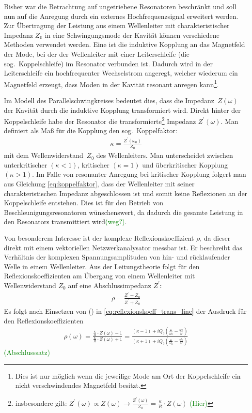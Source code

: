 \documentclass[11pt, a4paper]{scrbook}
\newcommand{\todo}[1]{{\textcolor{Green}{(#1)}}}
\begin{document}
	Bisher war die Betrachtung auf ungetriebene Resonatoren beschränkt und soll nun auf die Anregung durch ein externes Hochfrequenzsignal erweitert werden.
	Zur Übertragung der Leistung aus einem Wellenleiter mit charakteristischer Impedanz $Z_0$ in eine Schwingungsmode der Kavität können verschiedene Methoden verwendet werden.
	Eine ist die induktive Kopplung an das Magnetfeld der Mode, bei der der Wellenleiter mit einer Leiterschleife (die sog.\ Koppelschleife) im Resonator verbunden ist.
	Dadurch wird in der Leiterschleife ein hochfrequenter Wechselstrom angeregt, welcher wiederum ein Magnetfeld erzeugt, dass Moden in der Kavität resonant anregen kann\footnote{Dies ist nur möglich wenn die jeweilige Mode am Ort der Koppelschleife ein nicht verschwindendes Magnetfeld besitzt.}.
	
	Im Modell des Parallelschwingkreises bedeutet dies, dass die Impedanz~$Z(\omega)$ der Kavität durch die induktive Kopplung transformiert wird.
	Direkt hinter der Koppelschleife habe der Resonator die transformierte\footnote{insbesondere gilt: $Z^\prime(\omega) \propto Z(\omega) \longrightarrow \frac{Z^\prime(\omega)}{Z_0} = \frac{\kappa}{R} \cdot Z(\omega)$ \todo{Hier}} Impedanz $Z^\prime(\omega)$.
	Man definiert als Maß für die Kopplung den sog.\ Koppelfaktor:
	\begin{align}
		\kappa = \frac{Z^\prime(\omega_0)}{Z_0}
		\label{eq:koppelfaktor}
	\end{align}
	mit dem Wellenwiderstand~$Z_0$ des Wellenleiters.
	Man unterscheidet zwischen unterkritischer $(\kappa < 1)$, kritischer $(\kappa = 1)$ und überkritischer Kopplung $(\kappa > 1)$.
	Im Falle von resonanter Anregung bei kritischer Kopplung folgert man aus Gleichung \eqref{eq:koppelfaktor}, dass der Wellenleiter mit seiner charakteristischen Impedanz abgeschlossen ist und somit keine Reflexionen an der Koppelschleife entstehen.
	Dies ist für den Betrieb von Beschleunigungsresonatoren wünschenswert, da dadurch die gesamte Leistung in den Resonators transmittiert wird\todo{weg?}.
	
	Von besonderem Interesse ist der komplexe Reflexionskoeffizient $\rho$, da dieser direkt mit einem vektoriellen Netzwerkanalysator messbar ist.
	Er beschreibt das Verhältnis der komplexen Spannungsamplituden von hin- und rücklaufender Welle in einem Wellenleiter.
	Aus der Leitungstheorie \cite{pozar} folgt für den Reflexionskoeffizienten am Übergang von einem Wellenleiter mit Wellenwiderstand $Z_0$ auf eine Abschlussimpedanz $Z^\prime$:
	\begin{align}
		\rho = \frac{Z^\prime - Z_0}{Z^\prime + Z_0}
		\label{eq:reflexionskoeff_trans_line}
	\end{align}
	Es folgt nach Einsetzen von () in \eqref{eq:reflexionskoeff_trans_line} der Ausdruck für den Reflexionskoeffizienten 
	\begin{align}
		\rho(\omega) = \frac{\frac{\kappa}{R} \cdot Z(\omega) - 1}{\frac{\kappa}{R} \cdot Z(\omega) + 1} = \frac{(\kappa - 1) + i  Q_0 \left( \frac{\omega}{\omega_0}  - \frac{\omega_0}{\omega}\right)}{\left( \kappa + 1 \right) + i  Q_0 \left( \frac{\omega}{\omega_0}  - \frac{\omega_0}{\omega}\right)}
	\end{align}
	\todo{Abschlusssatz}
\end{document}
